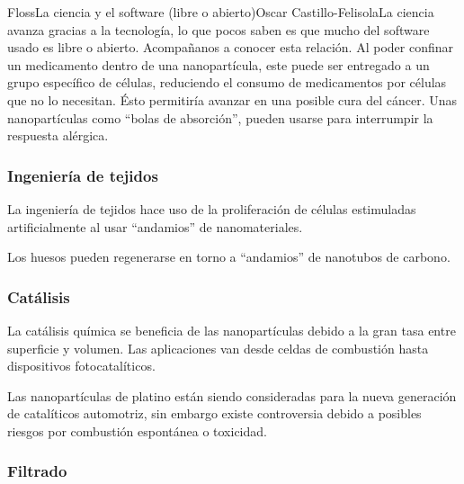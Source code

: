 \begin{Artikel}{Floss}{La ciencia y el software (libre o abierto)}{Oscar Castillo-Felisola}{La ciencia avanza gracias a la tecnolog\'ia, lo que pocos saben es que mucho del software usado es libre o abierto. Acompa\~nanos a conocer esta relaci\'on.}
Al poder confinar un medicamento dentro de una nanopart\'icula, este puede ser entregado a un grupo espec\'ifico de c\'elulas, reduciendo el consumo de medicamentos por c\'elulas que no lo necesitan. \'Esto permitir\'ia avanzar en una posible %
cura del c\'ancer.
Unas nanopart\'iculas como ``bolas de absorci\'on'', pueden usarse para interrumpir la respuesta al\'ergica. 

\subsubsection*{Ingenier\'ia de tejidos}

La ingenier\'ia de tejidos hace uso de la proliferaci\'on de c\'elulas estimuladas artificialmente al usar ``andamios'' de nanomateriales.

Los huesos pueden regenerarse en torno a ``andamios'' de nanotubos de carbono.




\subsubsection*{Cat\'alisis}

La cat\'alisis qu\'imica se beneficia de las nanopart\'iculas debido a la gran tasa entre superficie y volumen. Las aplicaciones van desde celdas de combusti\'on hasta dispositivos fotocatal\'iticos.

Las nanopart\'iculas de platino est\'an siendo consideradas para la nueva generaci\'on de catal\'iticos automotriz, sin embargo existe controversia debido a posibles riesgos por combusti\'on espont\'anea o toxicidad.

\subsubsection*{Filtrado}


\end{Artikel}
